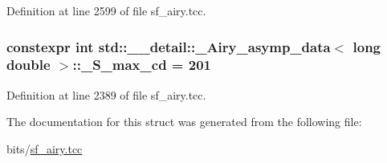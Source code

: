 Definition at line 2599 of file sf\+\_\+airy.\+tcc.

\subsubsection[{\texorpdfstring{\+\_\+\+S\+\_\+max\+\_\+cd}{_S_max_cd}}]{\setlength{\rightskip}{0pt plus 5cm}constexpr int {\bf std\+::\+\_\+\+\_\+detail\+::\+\_\+\+Airy\+\_\+asymp\+\_\+data}$<$ long double $>$\+::\+\_\+\+S\+\_\+max\+\_\+cd = 201\hspace{0.3cm}{\ttfamily [static]}}\hypertarget{structstd_1_1____detail_1_1__Airy__asymp__data_3_01long_01double_01_4_a6a21ac69ffc53d33ebc346981bc52b9a}{}\label{structstd_1_1____detail_1_1__Airy__asymp__data_3_01long_01double_01_4_a6a21ac69ffc53d33ebc346981bc52b9a}


Definition at line 2389 of file sf\+\_\+airy.\+tcc.



The documentation for this struct was generated from the following file\+:\begin{DoxyCompactItemize}
\item 
bits/\hyperlink{sf__airy_8tcc}{sf\+\_\+airy.\+tcc}\end{DoxyCompactItemize}

